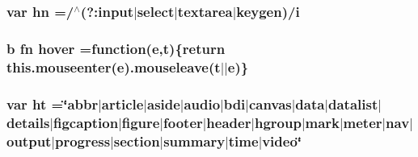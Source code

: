 \hypertarget{jquery-1_89_81_8min_8js_a703d7f6a2aadb540eb051a5f62674194}{
\subsubsection[{hn}]{\setlength{\rightskip}{0pt plus 5cm}var hn =/$^\wedge$(?\-:input$\vert$select$\vert$textarea$\vert$keygen)/{\bf i}}}\label{jquery-1_89_81_8min_8js_a703d7f6a2aadb540eb051a5f62674194}
\hypertarget{jquery-1_89_81_8min_8js_add99365d995edf0ce49a1f5dd84961b5}{
\subsubsection[{hover}]{ {\bf b} {\bf fn} hover =function({\bf e},{\bf t})\{return this.\-mouseenter({\bf e}).mouseleave({\bf t}$\vert$$\vert${\bf e})\}}}\label{jquery-1_89_81_8min_8js_add99365d995edf0ce49a1f5dd84961b5}
\hypertarget{jquery-1_89_81_8min_8js_a0fb2ce3c01b9db5fff661658be56f2ac}{
\subsubsection[{ht}]{\setlength{\rightskip}{0pt plus 5cm}var ht =\char`\"{}abbr$\vert$article$\vert$aside$\vert$audio$\vert$bdi$\vert$canvas$\vert${\bf data}$\vert$datalist$\vert$details$\vert$figcaption$\vert$figure$\vert$footer$\vert$header$\vert$hgroup$\vert$mark$\vert$meter$\vert$nav$\vert$output$\vert$progress$\vert$section$\vert$summary$\vert$time$\vert$video\char`\"{}}}\label{jquery-1_89_81_8min_8js_a0fb2ce3c01b9db5fff661658be56f2ac}
